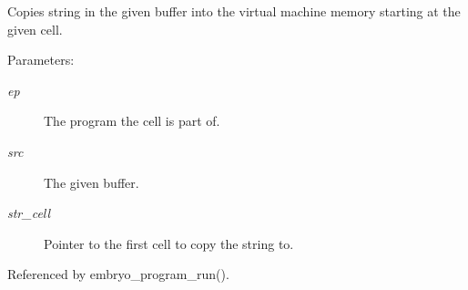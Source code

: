 Copies string in the given buffer into the virtual machine memory starting at the given cell. 

\begin{Desc}
\item[Parameters:]
\begin{description}
\item[{\em ep}]The program the cell is part of. \item[{\em src}]The given buffer. \item[{\em str\_\-cell}]Pointer to the first cell to copy the string to. \end{description}
\end{Desc}


Referenced by embryo\_\-program\_\-run().
